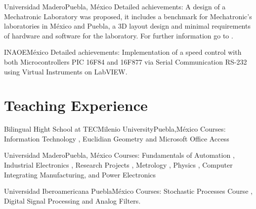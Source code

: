 \documentclass[10pt,a4paper,roman]{moderncv}
\begin{document}
{Universidad Madero}{Puebla, M\'exico}{}
{Detailed achievements: A design of a Mechatronic Laboratory was proposed, it includes a benchmark for
Mechatronic's laboratories in M\'exico and Puebla, a 3D layout design and minimal
requirements of hardware and software for the laboratory.
For further information go to \href{https://sites.google.com/site/perezxochicaleprojects/mechatronicslaboratorydesign}{\faExternalLink}.
}

{INAOE}{M\'exico}{}
{Detailed achievements:
Implementation of a speed control with both Microcontrollers PIC 16F84 and 16F877
via Serial Communication RS-232 using Virtual Instruments on LabVIEW.
}

\section{Teaching Experience}

{Bilingual Hight School at TECMilenio University}{Puebla,M\'exico}{}
{Courses:
Information Technology \href{https://sites.google.com/site/perezxochicale/teaching/iit}{\faExternalLink},
Euclidian Geometry  \href{https://sites.google.com/site/perezxochicale/teaching/euclidean-geometry}{\faExternalLink}
and
Microsoft Office Access \href{https://sites.google.com/site/perezxochicale/teaching/moa}{\faExternalLink}
}

{Universidad Madero}{Puebla, M\'exico}{}
{Courses: Fundamentals of Automation
\href{https://sites.google.com/site/perezxochicale/digital-electronics}{\faExternalLink},
Industrial Electronics \href{https://sites.google.com/site/perezxochicale/ie}{\faExternalLink},
Research Projects \href{https://sites.google.com/site/perezxochicale/latex/thesistemplate}{\faExternalLink},
Metrology \href{https://sites.google.com/site/perezxochicale/metrology}{\faExternalLink},
Physics \href{http://goo.gl/fffnG}{\faExternalLink},
Computer Integrating Manufacturing, and Power Electronics
}

{Universidad Iberoamericana Puebla}{M\'exico}{}
{Courses: Stochastic Processes Course
\href{https://sites.google.com/site/perezxochicale/stochastic-processes-course}{\faExternalLink},
Digital Signal Processing
\href{https://sites.google.com/site/perezxochicale/digital-signal-processing-course}{\faExternalLink}
and Analog Filters.
}
\end{document}
